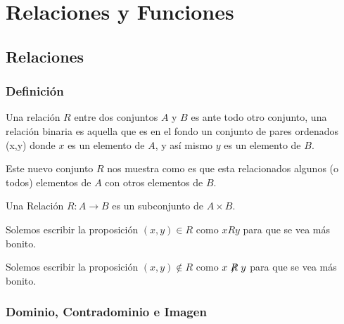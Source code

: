 \documentclass[12pt, fleqn]{report}                             %
\theoremstyle{break}                                            %
\begin{document}
\part{Relaciones y Funciones}



    \chapter{Relaciones}
        \clearpage

        \section{Definición}

            Una relación $R$ entre dos conjuntos $A$ y $B$ es ante todo otro conjunto, una relación
            binaria es aquella que es en el fondo un conjunto de pares ordenados (x,y) donde $x$ es un
            elemento de $A$, y así mismo $y$ es un elemento de $B$.

            Este nuevo conjunto $R$ nos muestra como es que esta relacionados algunos (o todos) elementos de
            $A$ con otros elementos de $B$.


            Una Relación $R: A \to B$ es un subconjunto de $A \times B$.

            Solemos escribir la proposición $(x, y) \in R$ como $x R y$ para que se vea más bonito.

            Solemos escribir la proposición $(x, y) \notin R$ como $x\centernot{R}y$ para que se vea más bonito.



        \clearpage
        \section{Dominio, Contradominio e Imagen}
                
\end{document}
